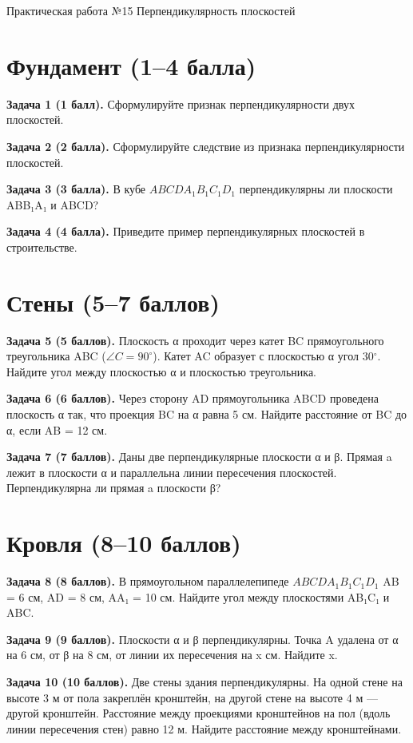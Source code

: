 \documentclass{umk-matematika}
\begin{document}
\maketitlepage
    {Практическая работа №15}
    {Перпендикулярность плоскостей}
    {}

\section{Фундамент (1--4 балла)}

\textbf{Задача 1 (1 балл).} Сформулируйте признак перпендикулярности двух плоскостей.

\textbf{Задача 2 (2 балла).} Сформулируйте следствие из признака перпендикулярности плоскостей.

\textbf{Задача 3 (3 балла).} В кубе $ABCDA_1B_1C_1D_1$ перпендикулярны ли плоскости ABB₁A₁ и ABCD?

\textbf{Задача 4 (4 балла).} Приведите пример перпендикулярных плоскостей в строительстве.

\section{Стены (5--7 баллов)}

\textbf{Задача 5 (5 баллов).} Плоскость α проходит через катет BC прямоугольного треугольника ABC ($\angle C = 90^\circ$). Катет AC образует с плоскостью α угол 30$^\circ$. Найдите угол между плоскостью α и плоскостью треугольника.

\textbf{Задача 6 (6 баллов).} Через сторону AD прямоугольника ABCD проведена плоскость α так, что проекция BC на α равна 5 см. Найдите расстояние от BC до α, если AB = 12 см.

\textbf{Задача 7 (7 баллов).} Даны две перпендикулярные плоскости α и β. Прямая a лежит в плоскости α и параллельна линии пересечения плоскостей. Перпендикулярна ли прямая a плоскости β?

\section{Кровля (8--10 баллов)}

\textbf{Задача 8 (8 баллов).} В прямоугольном параллелепипеде $ABCDA_1B_1C_1D_1$ AB = 6 см, AD = 8 см, AA₁ = 10 см. Найдите угол между плоскостями AB₁C₁ и ABC.

\textbf{Задача 9 (9 баллов).} Плоскости α и β перпендикулярны. Точка A удалена от α на 6 см, от β на 8 см, от линии их пересечения на x см. Найдите x.

\textbf{Задача 10 (10 баллов).} Две стены здания перпендикулярны. На одной стене на высоте 3 м от пола закреплён кронштейн, на другой стене на высоте 4 м — другой кронштейн. Расстояние между проекциями кронштейнов на пол (вдоль линии пересечения стен) равно 12 м. Найдите расстояние между кронштейнами.
\end{document}
